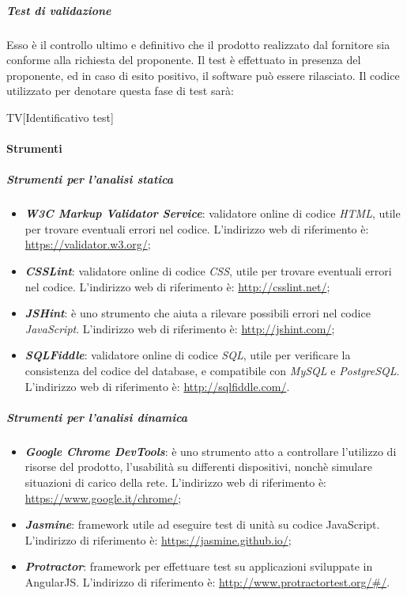 		\subparagraph{Test di validazione}
		Esso è il controllo ultimo e definitivo che il prodotto realizzato dal fornitore sia conforme alla richiesta del proponente. Il test è effettuato in presenza del proponente, ed in caso di esito positivo, il software può essere rilasciato.
		Il codice utilizzato per denotare questa fase di test sarà:
		
		\begin{center}
			TV[Identificativo test]
		\end{center}
			
		\paragraph{Strumenti}
		
		\subparagraph{Strumenti per l'analisi statica}
		
		\begin{itemize}
			\item \textbf{\textit{W3C Markup Validator Service}}: validatore online di codice \textit{HTML}, utile per trovare eventuali errori nel codice. L'indirizzo web di riferimento è: \url{https://validator.w3.org/};
			\item \textbf{\textit{CSSLint}}: validatore online di codice \textit{CSS}, utile per trovare eventuali errori nel codice. L'indirizzo web di riferimento è: \url{http://csslint.net/};
			\item \textit{\textbf{JSHint}}: è uno strumento che aiuta a rilevare possibili
			errori nel codice \textit{JavaScript}. L'indirizzo web di riferimento è: \url{http://jshint.com/};
			\item \textbf{\textit{SQLFiddle}}: validatore online di codice \textit{SQL}, utile per verificare la consistenza del codice del database, e compatibile con \textit{MySQL} e \textit{PostgreSQL}. L'indirizzo web di riferimento è: \url{http://sqlfiddle.com/}.
		\end{itemize}
	
	\subparagraph{Strumenti per l'analisi dinamica}
		\begin{itemize}
			\item \textbf{\textit{Google Chrome DevTools}}: è uno strumento atto a controllare l'utilizzo di risorse del prodotto, l'usabilità su differenti dispositivi, nonchè simulare situazioni di carico della rete. L'indirizzo web di riferimento è: \url{https://www.google.it/chrome/};
			\item \textbf{\textit{Jasmine}}: framework utile ad eseguire test di unità su codice JavaScript. L'indirizzo di riferimento è: \url{https://jasmine.github.io/};
			\item \textbf{\textit{Protractor}}: framework per effettuare test su applicazioni sviluppate in AngularJS. L'indirizzo di riferimento è: \url{http://www.protractortest.org/#/}.
		\end{itemize}
	\newpage

